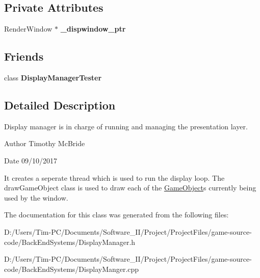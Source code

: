 \subsection*{Private Attributes}
\begin{DoxyCompactItemize}
\item 
\mbox{\label{class_display_manager_abe0369d0fa6b544c77d9d50d50f949cf}} 
Render\+Window $\ast$ {\bfseries \+\_\+dispwindow\+\_\+ptr}
\end{DoxyCompactItemize}
\subsection*{Friends}
\begin{DoxyCompactItemize}
\item 
\mbox{\label{class_display_manager_a34f8fb8dbcfaa7c498563849f0b88aeb}} 
class {\bfseries Display\+Manager\+Tester}
\end{DoxyCompactItemize}


\subsection{Detailed Description}
Display manager is in charge of running and managing the presentation layer. 

\begin{DoxyAuthor}{Author}
Timothy Mc\+Bride 
\end{DoxyAuthor}
\begin{DoxyDate}{Date}
09/10/2017
\end{DoxyDate}
It creates a seperate thread which is used to run the display loop. The draw\+Game\+Object class is used to draw each of the \hyperlink{class_game_object}{Game\+Object}\textquotesingle{}s currently being used by the window. 

The documentation for this class was generated from the following files\+:\begin{DoxyCompactItemize}
\item 
D\+:/\+Users/\+Tim-\/\+P\+C/\+Documents/\+Software\+\_\+\+I\+I/\+Project/\+Project\+Files/game-\/source-\/code/\+Back\+End\+Systems/Display\+Manager.\+h\item 
D\+:/\+Users/\+Tim-\/\+P\+C/\+Documents/\+Software\+\_\+\+I\+I/\+Project/\+Project\+Files/game-\/source-\/code/\+Back\+End\+Systems/Display\+Manger.\+cpp\end{DoxyCompactItemize}
